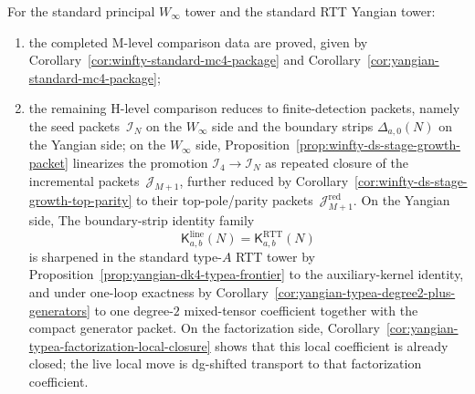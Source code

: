 \begin{proposition}
\label{prop:paired-standard-mc4-frontier}
For the standard principal
\texorpdfstring{$W_\infty$}{W_infty} tower and the standard RTT Yangian
tower:
\begin{enumerate}[label=\textup{(\alph*)}]
\item the completed M-level comparison data are proved,
 given by
 Corollary~\ref{cor:winfty-standard-mc4-package} and
 Corollary~\ref{cor:yangian-standard-mc4-package};
\item the remaining H-level comparison reduces to finite-detection
 packets, namely the seed packets~$\mathcal{I}_N$ on the
 \texorpdfstring{$W_\infty$}{W_infty} side and the boundary strips
 $\Delta_{a,0}(N)$ on the Yangian side; on the
 \texorpdfstring{$W_\infty$}{W_infty} side,
 Proposition~\ref{prop:winfty-ds-stage-growth-packet} linearizes the
 promotion $\mathcal{I}_4\to\mathcal{I}_N$ as repeated closure of the
 incremental packets~$\mathcal{J}_{M+1}$, further reduced by
 Corollary~\ref{cor:winfty-ds-stage-growth-top-parity} to their
 top-pole/parity packets~$\mathcal{J}_{M+1}^{\mathrm{red}}$.
 On the Yangian side,
 The boundary-strip identity family
 \[
 \mathsf{K}^{\mathrm{line}}_{a,b}(N)
 =
 \mathsf{K}^{\mathrm{RTT}}_{a,b}(N)
 \]
 is sharpened in the standard type-$A$ RTT tower by
 Proposition~\ref{prop:yangian-dk4-typea-frontier} to the
 auxiliary-kernel identity, and under one-loop exactness by
 Corollary~\ref{cor:yangian-typea-degree2-plus-generators} to one
 degree-$2$ mixed-tensor coefficient together with the compact
 generator packet. On the factorization side,
 Corollary~\ref{cor:yangian-typea-factorization-local-closure}
 shows that this local coefficient is already closed; the live
 local move is dg-shifted transport to that factorization coefficient.


\end{enumerate}
\end{proposition}
